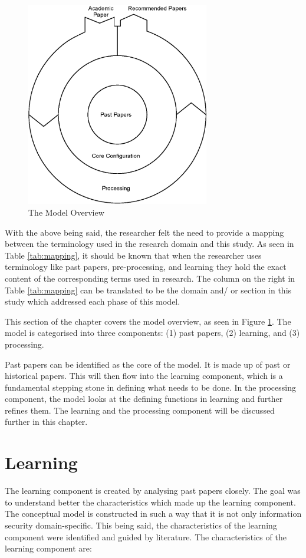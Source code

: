 \begin{figure}[htbp]
\centering
\includegraphics[width=8cm]{./figures/overview3.eps}
\caption{The Model Overview}
\label{fig:Modeloverview}
\end{figure}

With the above being said, the researcher felt the need to provide a mapping between the terminology used in the research domain and this study. As seen in Table \ref{tab:mapping}, it should be known that when the researcher uses terminology like past papers, pre-processing, and learning they hold the exact content of the corresponding terms used in research. The column on the right in Table \ref{tab:mapping} can be translated to be the domain and/ or section in this study which addressed each phase of this model.

This section of the chapter covers the model overview, as seen in Figure \ref{fig:Modeloverview}. The model is categorised into three components: (1) past papers, (2) learning, and (3) processing.

Past papers can be identified as the core of the model. It is made up of past or historical papers. This will then flow into the learning component, which is a fundamental stepping stone in defining what needs to be done. In the processing component, the model looks at the defining functions in learning and further refines them. The learning and the processing component will be discussed further in this chapter.

\section{Learning}

The learning component is created by analysing past papers closely. The goal was to understand better the characteristics which made up the learning component. The conceptual model is constructed in such a way that it is not only information security domain-specific. This being said, the characteristics of the learning component were identified and guided by literature. The characteristics of the learning component are:


